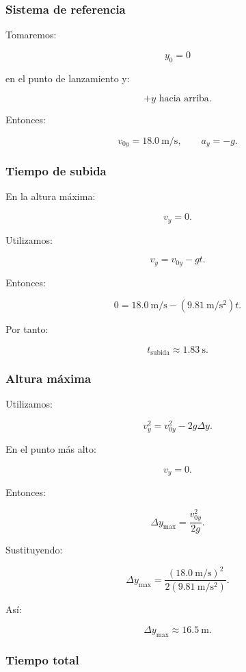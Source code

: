 \subsubsection*{Sistema de referencia}

Tomaremos:

\[ y_0=0 \]

en el punto de lanzamiento y:

\[ +y\text{ hacia arriba}. \]

Entonces:

\[
v_{0y}=\SI{18.0}{\meter\per\second},
\qquad
a_y=-g.
\]


\subsubsection*{Tiempo de subida}

En la altura máxima:

\[ v_y=0. \]

Utilizamos:

\[ v_y=v_{0y}-gt. \]

Entonces:

\[
0
=
\SI{18.0}{\meter\per\second}
-
(\SI{9.81}{\meter\per\second\squared})t.
\]

Por tanto:

\[ \boxed{t_{\text{subida}}\approx\SI{1.83}{\second}}. \]


\subsubsection*{Altura máxima}

Utilizamos:

\[ v_y^2=v_{0y}^2-2g\Delta y. \]

En el punto más alto:

\[ v_y=0. \]

Entonces:

\[ \Delta y_{\max}=\frac{v_{0y}^2}{2g}. \]

Sustituyendo:

\[
\Delta y_{\max}
=
\frac{
(\SI{18.0}{\meter\per\second})^2
}{
2(\SI{9.81}{\meter\per\second\squared})
}.
\]

Así:

\[ \boxed{\Delta y_{\max}\approx\SI{16.5}{\meter}}. \]


\subsubsection*{Tiempo total}

